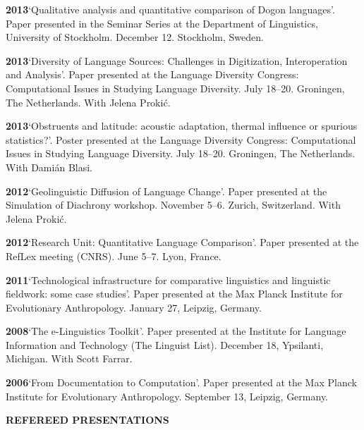 \documentclass[11pt]{article}
\newcommand{\hangpara}{
 \setlength{\parindent}{0in} %
 \hangindent=0.42in %
}
\begin{document}
\vskip 6pt
\hangpara
{\bf 2013}\hspace{1ex}`Qualitative analysis and quantitative comparison of Dogon languages'. Paper presented in the Seminar Series at the Department of Linguistics, University of Stockholm. December 12. Stockholm, Sweden.

\vskip 6pt
\hangpara
{\bf 2013}\hspace{1ex}`Diversity of Language Sources: Challenges in Digitization, Interoperation and Analysis'. Paper presented at the Language Diversity Congress: Computational Issues in Studying Language Diversity. July 18--20. Groningen, The Netherlands. With Jelena Proki{\'c}.

\vskip 6pt
\hangpara
{\bf 2013}\hspace{1ex}`Obstruents and latitude: acoustic adaptation, thermal influence or spurious statistics?'. Poster presented at the Language Diversity Congress: Computational Issues in Studying Language Diversity. July 18--20. Groningen, The Netherlands. With Dami{\'a}n Blasi.

\vskip 6pt
\hangpara
{\bf 2012}\hspace{1ex}`Geolinguistic Diffusion of Language Change'. Paper presented at the Simulation of Diachrony workshop. November 5--6. Zurich, Switzerland. With Jelena Proki{\'c}.

\vskip 6pt
\hangpara
{\bf 2012}\hspace{1ex}`Research Unit: Quantitative Language Comparison'. Paper presented at the RefLex meeting (CNRS). June 5--7. Lyon, France. 

\vskip 6pt
\hangpara
{\bf 2011}\hspace{1ex}`Technological infrastructure for comparative linguistics and linguistic fieldwork: some case studies'. Paper presented at the Max Planck Institute for Evolutionary Anthropology. January 27, Leipzig, Germany. 

\vskip 6pt
\hangpara
{\bf 2008}\hspace{1ex}`The e-Linguistics Toolkit'. Paper presented at the Institute for Language Information and Technology (The Linguist List). December 18, Ypsilanti, Michigan. With Scott Farrar.

\vskip 6pt
\hangpara
{\bf 2006}\hspace{1ex}`From Documentation to Computation'. Paper presented at the Max Planck Institute for Evolutionary Anthropology. September 13, Leipzig, Germany.


\vskip 20pt
\begin{flushleft}
{\bf REFEREED PRESENTATIONS}
\end{flushleft}
\end{document}
